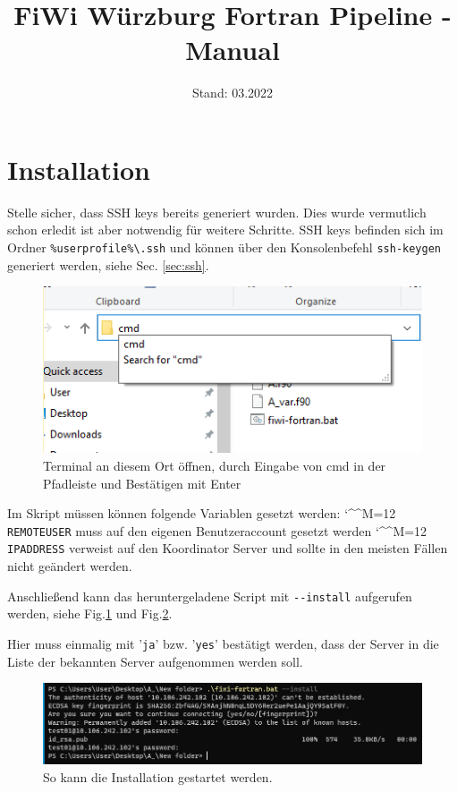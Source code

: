 \documentclass[11pt, a4paper]{article}
\title{\vspace{-3cm}FiWi Würzburg Fortran Pipeline - Manual}
\date{Stand: 03.2022}
\newcommand{\bs}{\textbackslash}
\def\e{\begingroup\catcode`\^^M=12 \xmymacro}
{\catcode`\^^M=12 %
 \gdef\xmymacro#1^^M{\begin{itemize}\item #1\end{itemize}\endgroup}%
}
\begin{document}
\maketitle

\bigskip\noindent


\vspace{-1cm}
\section{Installation}


Stelle sicher, dass SSH keys bereits generiert wurden. Dies wurde vermutlich schon erledit ist aber notwendig für weitere Schritte.
SSH keys befinden sich im Ordner \texttt{\%userprofile\%\bs.ssh} und können über den Konsolenbefehl \texttt{ssh-keygen} generiert werden, siehe Sec. \ref{sec:ssh}.

\begin{figure}
    \centering
    \includegraphics[width=0.65\linewidth]{./pics/2022-03-16_15-36.png}
    \caption{Terminal an diesem Ort öffnen, durch Eingabe von cmd in der Pfadleiste und Bestätigen mit Enter}
    \vspace{-4em}
    \label{fig:install-1}
\end{figure}

Im Skript müssen können folgende Variablen gesetzt werden:
\e \texttt{REMOTEUSER} muss auf den eigenen Benutzeraccount gesetzt werden
\e \texttt{IPADDRESS} verweist auf den Koordinator Server und sollte in den meisten Fällen nicht geändert werden.

Anschließend kann das heruntergeladene Script mit \texttt{-{}-install} aufgerufen werden, siehe Fig.\ref{fig:install-1} und Fig.\ref{fig:install-2}.

Hier muss einmalig mit '\texttt{ja}' bzw. '\texttt{yes}' bestätigt werden, dass der Server in die Liste der bekannten Server aufgenommen werden soll.

\begin{figure}[h]
    \centering
    \includegraphics[width=1\linewidth]{./pics/2022-03-08_23-57.png}
    \caption{So kann die Installation gestartet werden.}
    \label{fig:install-2}
\end{figure}
\end{document}
